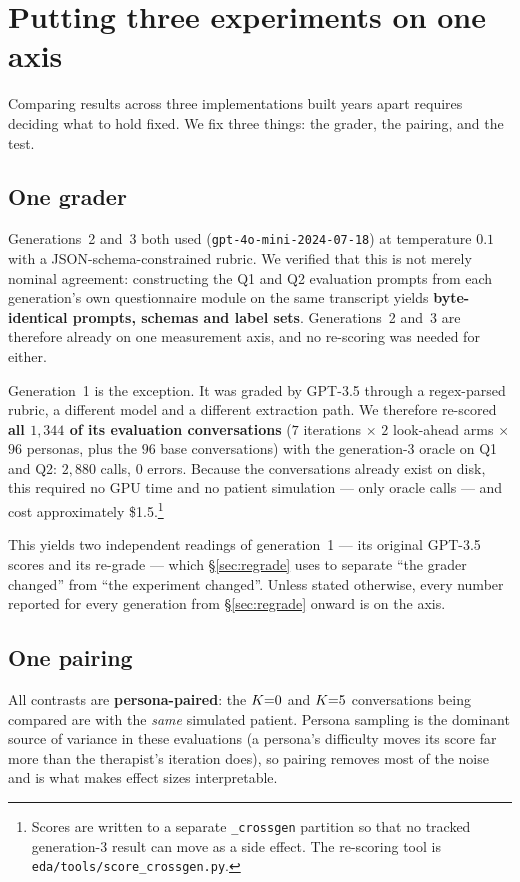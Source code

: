 \section{Putting three experiments on one axis}
\label{sec:method}

Comparing results across three implementations built years apart requires deciding what to
hold fixed. We fix three things: the grader, the pairing, and the test.

\subsection{One grader}
\label{sec:one-grader}
Generations~2 and~3 both used \primaryjudge{} (\texttt{gpt-4o-mini-2024-07-18}) at temperature
$0.1$ with a JSON-schema-constrained rubric. We verified that this is not merely nominal
agreement: constructing the Q1 and Q2 evaluation prompts from each generation's own
questionnaire module on the same transcript yields \textbf{byte-identical prompts, schemas and
label sets}. Generations~2 and~3 are therefore already on one measurement axis, and no
re-scoring was needed for either.

Generation~1 is the exception. It was graded by GPT-3.5 through a regex-parsed rubric, a
different model and a different extraction path. We therefore re-scored \textbf{all $1{,}344$
of its evaluation conversations} ($7$ iterations $\times$ $2$ look-ahead arms $\times$ $96$
personas, plus the $96$ base conversations) with the generation-3 oracle on Q1 and Q2:
$2{,}880$ calls, $0$ errors. Because the conversations already exist on disk, this required
no GPU time and no patient simulation --- only oracle calls --- and cost approximately
\$1.5.\footnote{Scores are written to a separate \texttt{\_crossgen} partition so that no
tracked generation-3 result can move as a side effect. The re-scoring tool is
\texttt{eda/tools/score\_crossgen.py}.}

This yields two independent readings of generation~1 --- its original GPT-3.5 scores and its
\primaryjudge{} re-grade --- which \S\ref{sec:regrade} uses to separate ``the grader changed''
from ``the experiment changed''. Unless stated otherwise, every number reported for every
generation from \S\ref{sec:regrade} onward is on the \primaryjudge{} axis.

\subsection{One pairing}
\label{sec:pairing}
All contrasts are \textbf{persona-paired}: the $K{=}0$ and $K{=}5$ conversations being
compared are with the \emph{same} simulated patient. Persona sampling is the dominant source
of variance in these evaluations (a persona's difficulty moves its score far more than the
therapist's iteration does), so pairing removes most of the noise and is what makes effect
sizes interpretable.

